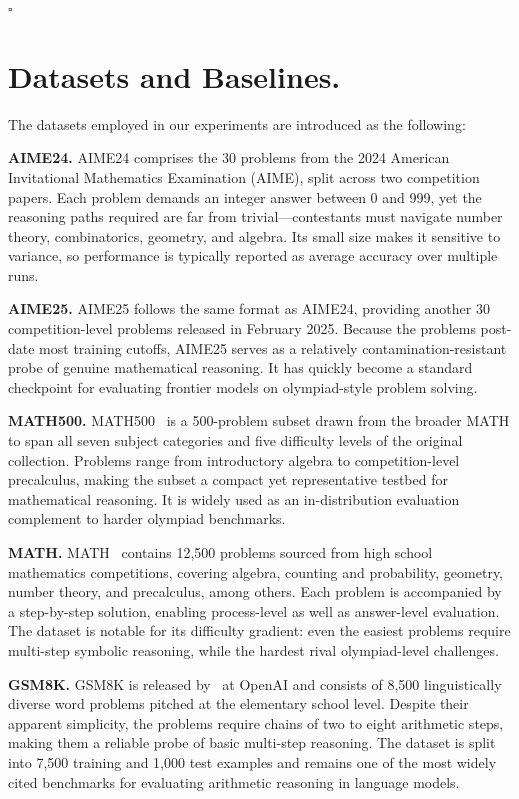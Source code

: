 \documentclass{llmxive}
\begin{document}
\hfill$\square$
\section{Datasets and Baselines.}\label{appx:b}
The datasets employed in our experiments are introduced as the following:

\noindent\textbf{AIME24.} AIME24 comprises the 30 problems from the 2024 American Invitational Mathematics Examination (AIME), split across two competition papers. Each problem demands an integer answer between 0 and 999, yet the reasoning paths required are far from trivial—contestants must navigate number theory, combinatorics, geometry, and algebra. Its small size makes it sensitive to variance, so performance is typically reported as average accuracy over multiple runs.

\noindent\textbf{AIME25.} AIME25 follows the same format as AIME24, providing another 30 competition-level problems released in February 2025. Because the problems post-date most training cutoffs, AIME25 serves as a relatively contamination-resistant probe of genuine mathematical reasoning. It has quickly become a standard checkpoint for evaluating frontier models on olympiad-style problem solving.

\noindent\textbf{MATH500.} MATH500~\cite{lightman2023let} is a 500-problem subset drawn from the broader MATH to span all seven subject categories and five difficulty levels of the original collection. Problems range from introductory algebra to competition-level precalculus, making the subset a compact yet representative testbed for mathematical reasoning. It is widely used as an in-distribution evaluation complement to harder olympiad benchmarks.

\noindent\textbf{MATH.} MATH~\cite{hendrycks2021measuring} contains 12,500 problems sourced from high school mathematics competitions, covering algebra, counting and probability, geometry, number theory, and precalculus, among others. Each problem is accompanied by a step-by-step solution, enabling process-level as well as answer-level evaluation. The dataset is notable for its difficulty gradient: even the easiest problems require multi-step symbolic reasoning, while the hardest rival olympiad-level challenges.

\noindent\textbf{GSM8K.} GSM8K is released by~\cite{cobbe2021training} at OpenAI and consists of 8,500 linguistically diverse word problems pitched at the elementary school level. Despite their apparent simplicity, the problems require chains of two to eight arithmetic steps, making them a reliable probe of basic multi-step reasoning. The dataset is split into 7,500 training and 1,000 test examples and remains one of the most widely cited benchmarks for evaluating arithmetic reasoning in language models.
\end{document}
